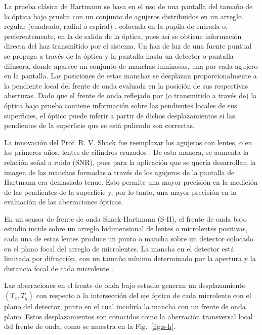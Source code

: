 \documentclass[letterpaper,12pt,oneside]{book}
\makeatletter
\renewcommand\section{\@startsection{section}{1}{\z@}{-3.5ex \@plus -1ex \@minus -.2ex}{2.3ex \@plus.2ex}{\normalfont\Large\bfseries\raggedright}}
\makeatother
\begin{document}
La prueba clásica de Hartmann  \cite{Hartmann} se basa en el uso de una pantalla del
tamaño de la óptica bajo prueba con un conjunto de agujeros distribuidos en un arreglo
regular (cuadrado, radial o espiral) \cite{Malacara, MalacaraDoblado}, colocada en la
pupila de entrada o, preferentemente, en la de salida de la óptica, pues así se obtiene
información directa del haz transmitido por el sistema. Un haz de luz de una fuente
puntual se propaga a través de la óptica y la pantalla hasta un detector o pantalla
difusora, donde aparece un conjunto de manchas luminosas, una por cada agujero en la
pantalla. Las posiciones de estas manchas se desplazan proporcionalmente a la pendiente
local del frente de onda evaluada en la posición de sus respectivas aberturas. Dado que el
frente de onda reflejado por (o transmitido a través de) la óptica bajo prueba contiene
información sobre las pendientes locales de sus superficies, el óptico puede inferir a
partir de dichos desplazamientos si las pendientes de la superficie que se está puliendo
son correctas.

La innovación del Prof. R. V. Shack fue reemplazar los agujeros con lentes, o en los
primeros años, lentes de cilindros cruzados \cite{Shack}. De esta manera, se aumenta la
relación señal a ruido (SNR), pues para la aplicación que se quería desarrollar, la imagen
de las manchas formadas a través de los agujeros de la pantalla de Hartmann era demasiado
tenue. Esto permite una mayor precisión en la medición de las pendientes de la superficie
y, por lo tanto, una mayor precisión en la evaluación de las aberraciones ópticas.

\section{Sensor Shack-Hartmann}

En un sensor de frente de onda Shack-Hartmann (S-H), el frente de onda bajo estudio incide
sobre un arreglo bidimensional de lentes o microlentes positivas, cada una de estas lentes
produce un punto o mancha sobre un detector colocado en el plano focal del arreglo de
microlentes. La mancha en el detector está limitada por difracción, con un tamaño mínimo
determinado por la apertura y la distancia focal de cada microlente \cite{Goodman}.

Las aberraciones en el frente de onda bajo estudio generan un desplazamiento $(T_x, T_y)$
con respecto a la intersección del eje óptico de cada microlente con el plano del
detector, punto en el cual incidiría la mancha con un frente de onda plano. Estos
desplazamientos son conocidos como la aberración transversal local del frente de onda,
como se muestra en la Fig.~\ref{fig:s-h}.
\end{document}
